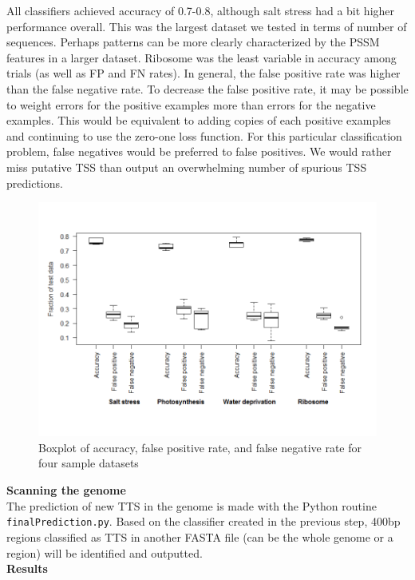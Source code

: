 \documentclass[12pt,letterpaper]{report}
\begin{document}
\indent All classifiers achieved accuracy of 0.7-0.8, although salt stress had a bit higher performance overall. This was the largest dataset we tested in terms of number of sequences. Perhaps patterns can be more clearly characterized by the PSSM features in a larger dataset. Ribosome was the least variable in accuracy among trials (as well as FP and FN rates). In general, the false positive rate was higher than the false negative rate. To decrease the false positive rate, it may be possible to weight errors for the positive examples more than errors for the negative examples. This would be equivalent to adding copies of each positive examples and continuing to use the zero-one loss function. For this particular classification problem, false negatives would be preferred to false positives. We would rather miss putative TSS than output an overwhelming number of spurious TSS predictions.\\

\begin{figure}
\centering
\includegraphics[scale=0.8]{Rplot.png}
\caption{Boxplot of accuracy, false positive rate, and false negative rate for four sample datasets}
\label{fig:box}
\end{figure}

{\Large\textbf{Scanning the genome}}\\

The prediction of new TTS in the genome is made with the Python routine\\ \texttt{finalPrediction.py}. Based on the classifier created in the previous step, 400bp regions classified as TTS in another FASTA file (can be the whole genome or a region) will be identified and outputted.\\

{\Large\textbf{Results}}\\



\nocite{*}

\end{document}
